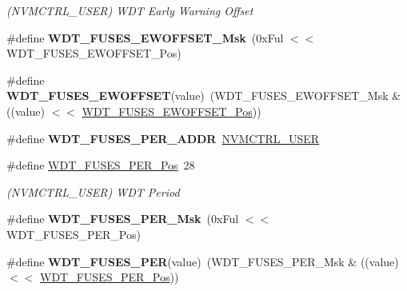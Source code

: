 \begin{DoxyCompactItemize}
\begin{DoxyCompactList}\small\item\em (N\+V\+M\+C\+T\+R\+L\+\_\+\+U\+S\+E\+R) W\+D\+T Early Warning Offset \end{DoxyCompactList}\item 
\hypertarget{group__fuses__api_ga7acf63462b40241031a53d6ecf5a0d69}{}\#define {\bfseries W\+D\+T\+\_\+\+F\+U\+S\+E\+S\+\_\+\+E\+W\+O\+F\+F\+S\+E\+T\+\_\+\+Msk}~(0x\+Ful $<$$<$ W\+D\+T\+\_\+\+F\+U\+S\+E\+S\+\_\+\+E\+W\+O\+F\+F\+S\+E\+T\+\_\+\+Pos)\label{group__fuses__api_ga7acf63462b40241031a53d6ecf5a0d69}

\item 
\hypertarget{group__fuses__api_ga97578a46129ba8e2a78d9c2d7e15186e}{}\#define {\bfseries W\+D\+T\+\_\+\+F\+U\+S\+E\+S\+\_\+\+E\+W\+O\+F\+F\+S\+E\+T}(value)~(W\+D\+T\+\_\+\+F\+U\+S\+E\+S\+\_\+\+E\+W\+O\+F\+F\+S\+E\+T\+\_\+\+Msk \& ((value) $<$$<$ \hyperlink{group__fuses__api_gae2f89f15eabc293811402651af74d059}{W\+D\+T\+\_\+\+F\+U\+S\+E\+S\+\_\+\+E\+W\+O\+F\+F\+S\+E\+T\+\_\+\+Pos}))\label{group__fuses__api_ga97578a46129ba8e2a78d9c2d7e15186e}

\item 
\hypertarget{group__fuses__api_ga2c50bf4f2c97da8a4a6ae114cc9c0c69}{}\#define {\bfseries W\+D\+T\+\_\+\+F\+U\+S\+E\+S\+\_\+\+P\+E\+R\+\_\+\+A\+D\+D\+R}~\hyperlink{group___s_a_m_l21_j18_a__base_ga7a7a83a5753fa323b61536e396083c99}{N\+V\+M\+C\+T\+R\+L\+\_\+\+U\+S\+E\+R}\label{group__fuses__api_ga2c50bf4f2c97da8a4a6ae114cc9c0c69}

\item 
\hypertarget{group__fuses__api_ga87db8b2566c9dd04e5c0cb3838175952}{}\#define \hyperlink{group__fuses__api_ga87db8b2566c9dd04e5c0cb3838175952}{W\+D\+T\+\_\+\+F\+U\+S\+E\+S\+\_\+\+P\+E\+R\+\_\+\+Pos}~28\label{group__fuses__api_ga87db8b2566c9dd04e5c0cb3838175952}

\begin{DoxyCompactList}\small\item\em (N\+V\+M\+C\+T\+R\+L\+\_\+\+U\+S\+E\+R) W\+D\+T Period \end{DoxyCompactList}\item 
\hypertarget{group__fuses__api_ga8c0047dcebe5a6775a5f141a9f1e1342}{}\#define {\bfseries W\+D\+T\+\_\+\+F\+U\+S\+E\+S\+\_\+\+P\+E\+R\+\_\+\+Msk}~(0x\+Ful $<$$<$ W\+D\+T\+\_\+\+F\+U\+S\+E\+S\+\_\+\+P\+E\+R\+\_\+\+Pos)\label{group__fuses__api_ga8c0047dcebe5a6775a5f141a9f1e1342}

\item 
\hypertarget{group__fuses__api_gadea5dd3449831980a604a0fe3dd323cb}{}\#define {\bfseries W\+D\+T\+\_\+\+F\+U\+S\+E\+S\+\_\+\+P\+E\+R}(value)~(W\+D\+T\+\_\+\+F\+U\+S\+E\+S\+\_\+\+P\+E\+R\+\_\+\+Msk \& ((value) $<$$<$ \hyperlink{group__fuses__api_ga87db8b2566c9dd04e5c0cb3838175952}{W\+D\+T\+\_\+\+F\+U\+S\+E\+S\+\_\+\+P\+E\+R\+\_\+\+Pos}))\label{group__fuses__api_gadea5dd3449831980a604a0fe3dd323cb}


\end{DoxyCompactItemize}
